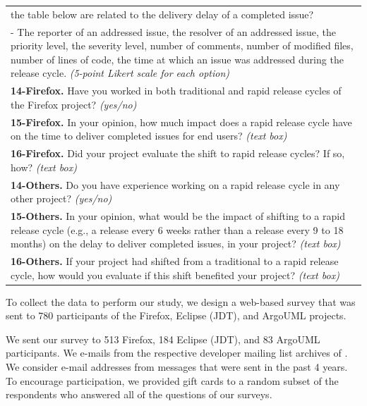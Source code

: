 \begin{table}[t!]
\begin{tabular}{p{}}
			the table below are related to the delivery delay of a
			completed issue?\\
			- The reporter of an addressed issue, the resolver of an
			addressed issue, the priority level, the severity level,
			number of comments, number of modified files, number of
			lines of code, the time at which an issue was addressed
			during the release cycle.
			{\em (5-point Likert scale for each option)}\tabularnewline
			\hline 
			\textbf{14-Firefox.} Have you worked in both traditional and rapid release cycles of
			the Firefox project? {\em (yes/no)}\tabularnewline
			\textbf{15-Firefox.} In your opinion, how much impact does a rapid release cycle have
			on the time to deliver completed issues for end users?
			{\em (text box)}\tabularnewline
			\textbf{16-Firefox.} Did your project evaluate the shift to rapid release cycles? If
			so, how? {\em (text box)}\tabularnewline
			\textbf{14-Others.} Do you have experience working on a
			rapid release cycle in any other project? {\em (yes/no)}\tabularnewline
			\textbf{15-Others.} In your opinion, what would be the
			impact of shifting to a rapid release cycle (e.g., a
			release every 6 weeks rather than a release every 9 to
			18 months) on the delay to deliver completed issues, in
			your project? {\em (text box)}\tabularnewline
			\textbf{16-Others.} If your project had shifted from a
			traditional to a rapid release cycle, how would you
			evaluate if this shift benefited your project? {\em (text box)}
		\end{tabular}
\end{table}

To collect the data to perform our \DIFdelbegin {}\DIFdelend \DIFaddbegin {}\DIFaddend study, we design a web-based survey
that was sent to 780 participants of the Firefox, Eclipse (JDT), and ArgoUML
projects. \DIFaddbegin {}

\DIFaddend We sent our \DIFaddbegin {}\DIFaddend survey to 513 Firefox, 184 Eclipse (JDT), and 83 ArgoUML
participants. We \DIFdelbegin {}\DIFdelend \DIFaddbegin {}\DIFaddend e-mails from the respective
developer mailing list archives of \DIFdelbegin {}\DIFdelend \DIFaddbegin {}\DIFaddend . We consider e-mail
addresses from messages that were sent in the past 4 years. To encourage
participation, we provided \DIFaddbegin {}\DIFaddend gift cards to a random subset of the
respondents who answered all of the questions of our surveys.

